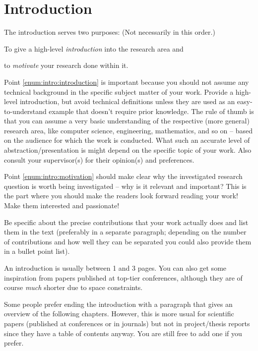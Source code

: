 \chapter{Introduction}\label{chap:Introduction}

{\parfillskip=0pt The introduction serves two purposes: \hfill (Not necessarily in this order.)\par}
\begin{compactenum}
  \item To give a high-level \emph{introduction} into the research area and\label{enum:intro:introduction}
  \item to \emph{motivate} your research done within it.\label{enum:intro:motivation}
\end{compactenum}

Point \ref{enum:intro:introduction} is important because you should not assume any technical background in the specific subject matter of your work. Provide a high-level introduction, but avoid technical definitions unless they are used as an easy-to-understand example that doesn't require prior knowledge. The rule of thumb is that you can assume a very basic understanding of the respective (more general) research area, like computer science, engineering, mathematics, and so on -- based on the audience for which the work is conducted. What such an accurate level of abstraction/presentation is might depend on the specific topic of your work. Also consult your supervisor(s) for their opinion(s) and preferences. 

Point \ref{enum:intro:motivation} should make clear why the investigated research question is worth being investigated -- why is it relevant and important? This is the part where you should make the readers look forward reading your work! Make them interested and passionate!

Be specific about the precise contributions that your work actually does and list them in the text (preferably in a separate paragraph; depending on the number of contributions and how well they can be separated you could also provide them in a bullet point list).

An introduction is usually between 1 and 3 pages. You can also get some inspiration from papers published at top-tier conferences, although they are of course \emph{much} shorter due to space constraints.

Some people prefer ending the introduction with a paragraph that gives an overview of the following chapters. However, this is more usual for scientific papers (published at conferences or in journals) but not in project/thesis reports since they have a table of contents anyway. You are still free to add one if you prefer.
